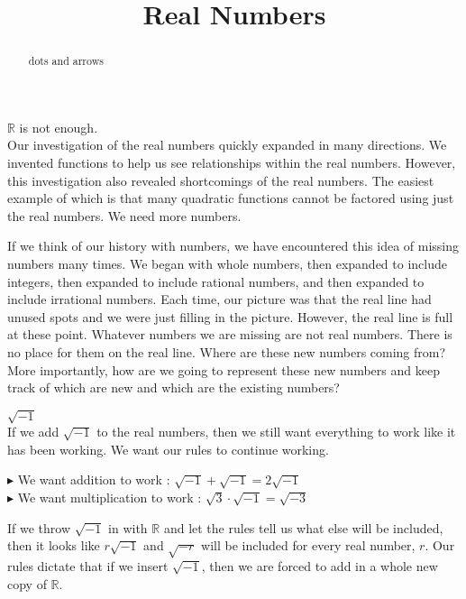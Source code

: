 \documentclass{ximera}
\title{Real Numbers}
\begin{document}
\begin{abstract}
dots and arrows
\end{abstract}
\maketitle



\textbf{$\mathbb{R}$} is not enough.  \\



Our investigation of the real numbers quickly expanded in many directions. We invented functions to help us see relationships within the real numbers.  However, this investigation also revealed shortcomings of the real numbers. The easiest example of which is that many quadratic functions cannot be factored using just the real numbers. We need more numbers.


If we think of our history with numbers, we have encountered this idea of missing numbers many times.  We began with whole numbers, then expanded to include integers, then expanded to include rational numbers, and then expanded to include irrational numbers.  Each time, our picture was that the real line had unused spots and we were just filling in the picture.  However, the real line is full at these point. Whatever numbers we are missing are not real numbers.  There is no place for them on the real line.  Where are these new numbers coming from? More importantly, how are we going to represent these new numbers and keep track of which are new and which are the existing numbers?


\begin{idea} \textbf{\textcolor{green!50!black}{$\sqrt{-1}$}} \\


If we add $\sqrt{-1}$ to the real numbers, then we still want everything to work like it has been working.  We want our rules to continue working.


$\blacktriangleright$ We want addition to work : $\sqrt{-1} + \sqrt{-1} = 2\sqrt{-1}$ \\

$\blacktriangleright$ We want multiplication to work : $\sqrt{3} \cdot \sqrt{-1} = \sqrt{-3}$ \\


\end{idea}


If we throw $\sqrt{-1}$ in with $\mathbb{R}$ and let the rules tell us what else will be included, then it looks like $r\sqrt{-1}$ and $\sqrt{-r}$ will be included for every real number, $r$.  Our rules dictate that if we insert $\sqrt{-1}$, then we are forced to add in a whole new copy of $\mathbb{R}$.
\end{document}
